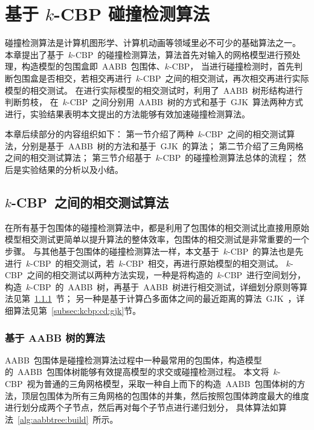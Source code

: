 

\chapter{基于 $k$-CBP 碰撞检测算法}
\label{cha:kcbp-collision-detection}

碰撞检测算法是计算机图形学、计算机动画等领域里必不可少的基础算法之一。
本章提出了基于~$k$-CBP~的碰撞检测算法，算法首先对输入的网格模型进行预处理，构造模型的包围盒即~AABB~包围体、$k$-CBP，
当进行碰撞检测时，首先判断包围盒是否相交，若相交再进行~$k$-CBP~之间的相交测试，再次相交再进行实际模型的相交测试。
在进行实际模型的相交测试时，利用了~AABB~树形结构进行判断剪枝，
在~$k$-CBP~之间分别用~AABB~树的方式和基于~GJK~算法两种方式进行，实验结果表明本文提出的方法能够有效加速碰撞检测算法。

本章后续部分的内容组织如下：
第一节介绍了两种~$k$-CBP~之间的相交测试算法，分别是基于~AABB~树的方法和基于~GJK~的算法；
第二节介绍了三角网格之间的相交测试算法；
第三节介绍基于~$k$-CBP~的碰撞检测算法总体的流程；
然后是实验结果的分析以及小结。

\section{$k$-CBP~之间的相交测试算法}
\label{sec:kcbp:cd}

在所有基于包围体的碰撞检测算法中，都是利用了包围体的相交测试比直接用原始模型相交测试更简单以提升算法的整体效率，包围体的相交测试是非常重要的一个步骤。
与其他基于包围体的碰撞检测算法一样，本文基于~$k$-CBP~的算法也是先进行~$k$-CBP~的相交测试，若~$k$-CBP~相交，再进行原始模型的相交测试。
$k$-CBP~之间的相交测试以两种方法实现，一种是将构造的~$k$-CBP~进行空间划分，构造~$k$-CBP~的~AABB~树，再基于~AABB~树进行相交测试，详细划分原则等算法见第~\ref{subsec:kcbp:cd:aabb}~节；
另一种是基于计算凸多面体之间的最近距离的算法~GJK~，详细算法见第~\ref{subsec:kcbp:cd:gjk}节。

\subsection{基于 AABB 树的算法}
\label{subsec:kcbp:cd:aabb}

AABB~包围体是碰撞检测算法过程中一种最常用的包围体，构造模型的~AABB~包围体树能够有效提高模型的求交或碰撞检测过程。
本文将~$k$-CBP~视为普通的三角网格模型，采取一种自上而下的构造~AABB~包围体树的方法，顶层包围体为所有三角网格的包围体的并集，然后按照包围体跨度最大的维度进行划分成两个子节点，然后再对每个子节点进行递归划分，
具体算法如算法~\ref{alg:aabbtree:build}~所示。

